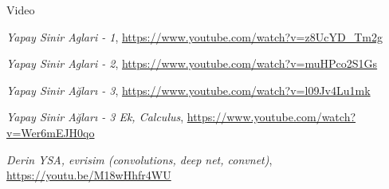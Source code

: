 \documentclass[12pt,fleqn]{article}\usepackage{../../common}
\begin{document}
Video

{\em Yapay Sinir Aglari - 1}, \url{https://www.youtube.com/watch?v=z8UcYD_Tm2g}

{\em Yapay Sinir Aglari - 2}, \url{https://www.youtube.com/watch?v=muHPco2S1Gs}

{\em Yapay Sinir Ağları - 3}, \url{https://www.youtube.com/watch?v=l09Jv4Lu1mk}

{\em Yapay Sinir Ağları - 3 Ek, Calculus}, \url{https://www.youtube.com/watch?v=Wer6mEJH0qo}

{\em Derin YSA, evrisim (convolutions, deep net, convnet)}, \url{https://youtu.be/M18wHhfr4WU}
\end{document}
